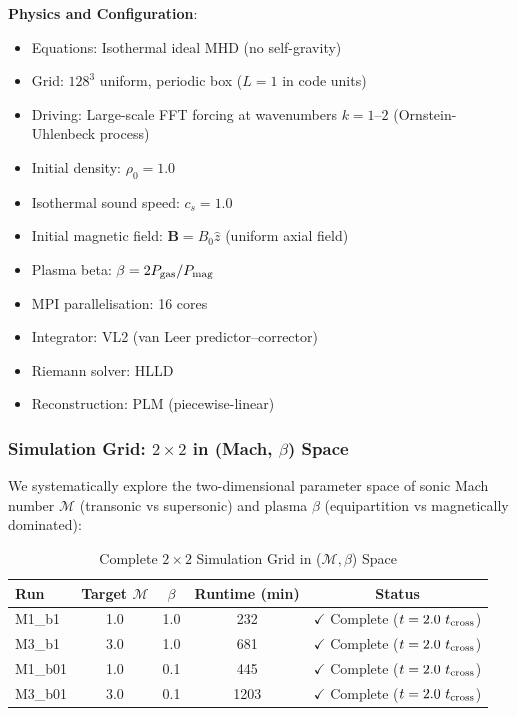 \documentclass[11pt,a4paper]{article}
\begin{document}
\textbf{Physics and Configuration}:
\begin{itemize}
    \item Equations: Isothermal ideal MHD (no self-gravity)
    \item Grid: $128^3$ uniform, periodic box ($L = 1$ in code units)
    \item Driving: Large-scale FFT forcing at wavenumbers $k = 1$--$2$ (Ornstein-Uhlenbeck process)
    \item Initial density: $\rho_0 = 1.0$
    \item Isothermal sound speed: $c_s = 1.0$
    \item Initial magnetic field: $\mathbf{B} = B_0 \hat{z}$ (uniform axial field)
    \item Plasma beta: $\beta = 2P_{\rm gas}/P_{\rm mag}$
    \item MPI parallelisation: 16 cores
    \item Integrator: VL2 (van Leer predictor--corrector)
    \item Riemann solver: HLLD
    \item Reconstruction: PLM (piecewise-linear)
\end{itemize}

\subsubsection{Simulation Grid: $2\times2$ in (Mach, $\beta$) Space}

We systematically explore the two-dimensional parameter space of sonic Mach number $\mathcal{M}$ (transonic vs supersonic) and plasma $\beta$ (equipartition vs magnetically dominated):

\begin{table}[H]
\centering
\caption{Complete $2\times2$ Simulation Grid in ($\mathcal{M}, \beta$) Space}
\begin{tabular}{lcccc}
\toprule
Run & Target $\mathcal{M}$ & $\beta$ & Runtime (min) & Status \\
\midrule
M1\_b1  & 1.0 & 1.0 & 232  & $\checkmark$ Complete ($t = 2.0~t_{\rm cross}$) \\
M3\_b1  & 3.0 & 1.0 & 681  & $\checkmark$ Complete ($t = 2.0~t_{\rm cross}$) \\
M1\_b01 & 1.0 & 0.1 & 445  & $\checkmark$ Complete ($t = 2.0~t_{\rm cross}$) \\
M3\_b01 & 3.0 & 0.1 & 1203 & $\checkmark$ Complete ($t = 2.0~t_{\rm cross}$) \\
\bottomrule
\end{tabular}
\end{table}
\end{document}
